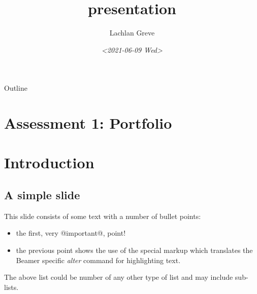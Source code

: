 \documentclass[bigger]{beamer}
\author{Lachlan Greve}
\date{\textit{<2021-06-09 Wed>}}
\title{presentation}
\begin{document}
\maketitle
\begin{frame}{Outline}
\tableofcontents
\end{frame}



\section{Assessment 1: Portfolio}
\label{sec:orgccf54dd}

\section{Introduction}
\label{sec:orgf967f14}

\subsection{A simple slide}
\label{sec:org848e65f}
This slide consists of some text with a number of bullet points:
\begin{itemize}
\item the first, very @important@, point!
\item the previous point shows the use of the special markup which translates the Beamer specific \emph{alter} command for highlighting text.
\end{itemize}

The above list could be number of any other type of list and may include sub-lists.
\end{document}
